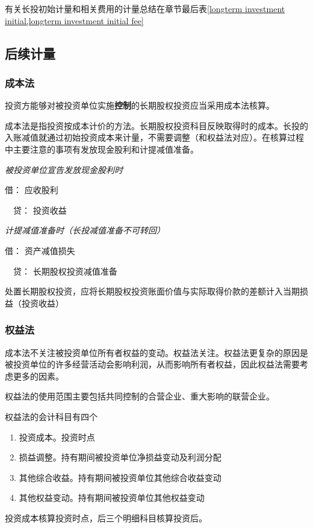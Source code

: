 \documentclass[UTF8,12pt]{ctexart}
\newenvironment{Dr}{\noindent 借：}{\par}
\newenvironment{Cr}{\noindent \ \ 贷：}{\par}
\numberwithin{equation}{section} %
\numberwithin{figure}{section}
\numberwithin{table}{section}
\begin{document}
	有关长投初始计量和相关费用的计量总结在章节最后表\ref{longterm investment initial,longterm investment initial fee}
	
	
	\subsection{后续计量}
	
	\subsubsection{成本法}
	投资方能够对被投资单位实施\textbf{控制}的长期股权投资应当采用成本法核算。
	
	成本法是指投资按成本计价的方法。长期股权投资科目反映取得时的成本。长投的入账减值就通过初始投资成本来计量，不需要调整（和权益法对应）。在核算过程中主要注意的事项有发放现金股利和计提减值准备。
	
	\textit{被投资单位宣告发放现金股利时}
	
	\begin{Dr}
		应收股利
	\end{Dr}
	\begin{Cr}
		投资收益
	\end{Cr}
	
	\textit{计提减值准备时（长投减值准备不可转回）}
	
	\begin{Dr}
		资产减值损失
	\end{Dr}
	\begin{Cr}
		长期股权投资减值准备
	\end{Cr}
	
	处置长期股权投资，应将长期股权投资账面价值与实际取得价款的差额计入当期损益（投资收益）
	
	\subsubsection{权益法}
	成本法不关注被投资单位所有者权益的变动。权益法关注。权益法更复杂的原因是被投资单位的许多经营活动会影响利润，从而影响所有者权益，因此权益法需要考虑更多的因素。
	
	
	权益法的使用范围主要包括共同控制的合营企业、重大影响的联营企业。
	
	权益法的会计科目有四个
	\begin{enumerate}
		\item 投资成本。投资时点
		
		\item 损益调整。持有期间被投资单位净损益变动及利润分配
		
		\item 其他综合收益。持有期间被投资单位其他综合收益变动
		
		\item 其他权益变动。持有期间被投资单位其他权益变动
	\end{enumerate}
	投资成本核算投资时点，后三个明细科目核算投资后。
	
\end{document}
